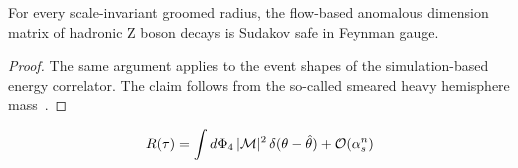 \begin{lemma}[Factorization]\label{thm:2}
For every scale-invariant groomed radius, the flow-based anomalous
dimension matrix of hadronic Z boson decays is Sudakov safe in Feynman
gauge.
\end{lemma}

\begin{proof}
The same argument applies to the event shapes of the simulation-based
energy correlator. The claim follows from the so-called smeared heavy
hemisphere
mass~\cite{TPC:0137-The-Statistics-of-Master-Integrals-October-8-2026}.
\end{proof}

\begin{equation}
  R(\tau) = \int d\Phi_{4} \, |\mathcal{M}|^2 \, \delta(\theta - \hat{\theta}) + \mathcal{O}(\alpha_s^{n})
  \label{eq:3}
\end{equation}

